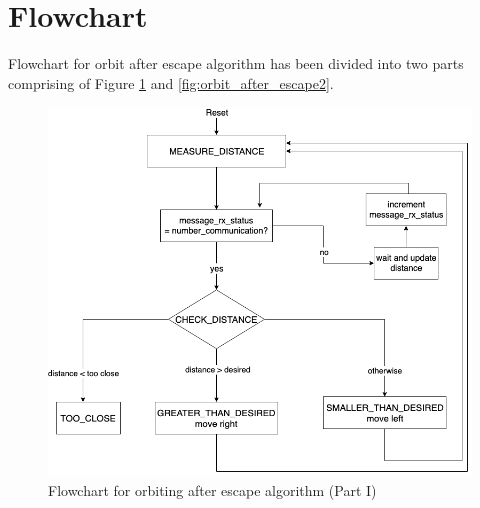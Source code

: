 \documentclass{report}[12pt]
\begin{document}
\section{Flowchart}
Flowchart for orbit after escape algorithm has been divided into two parts comprising of Figure \ref{fig:orbit_after_escape1} and \ref{fig:orbit_after_escape2}.
\begin{figure}[H]
	\centering
	\includegraphics[scale=0.55]{star_planet_escape1}
	\caption{Flowchart for orbiting after escape algorithm (Part I)}
	\label{fig:orbit_after_escape1}
\end{figure}
\end{document}
